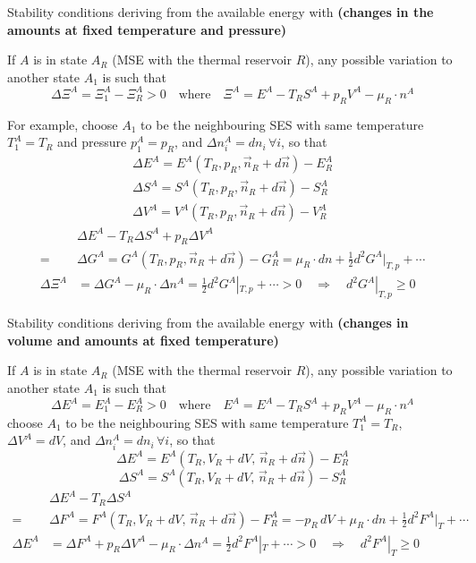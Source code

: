 \begin{thm}
    Stability conditions deriving from the available energy with \textbf{(changes in the \textcolor{b1}{amounts} at fixed temperature and pressure)}

    If \( A \) is in state \( A_R \) (MSE with the thermal reservoir \( R \)), any possible variation to another state \( A_1 \) is such that  
    \[
    \Delta \Xi^A = \Xi_1^A - \Xi_R^A > 0 \quad \text{where} \quad \Xi^A = E^A - T_R S^A + p_R V^A - \mu_R \cdot n^A
    \]

    For example, choose \( A_1 \) to be the neighbouring SES with same temperature \( T_1^A = T_R \) and pressure \( p_1^A = p_R \), and \(\Delta n_i^A = dn_i \, \forall i\), so that  
\begin{gather*}
        \Delta E^A = E^A (T_R, p_R, \vec{n}_R + d\vec{n}) - E_R^A
    \\
        \Delta S^A = S^A (T_R, p_R, \vec{n}_R + d\vec{n}) - S_R^A
    \\
        \Delta V^A = V^A (T_R, p_R, \vec{n}_R + d\vec{n}) - V_R^A
\end{gather*}
\begin{align*}
        &\Delta E^A - T_R \Delta S^A + p_R \Delta V^A\\
        =& \Delta G^A = G^A (T_R, p_R, \vec{n}_R + d\vec{n}) - G_R^A = \mu_R \cdot dn + \frac{1}{2} d^2 G^A |_{T,p} + \cdots
    \\
        \Delta \Xi^A &= \Delta G^A - \mu_R \cdot \Delta n^A = \frac{1}{2} d^2 G^A |_{T,p} + \cdots > 0 \quad \Rightarrow \quad d^2 G^A |_{T,p} \geq 0
\end{align*}
\end{thm}
\begin{thm}
    Stability conditions deriving from the available energy with \textbf{(changes in \textcolor{b1}{volume and amounts} at fixed temperature)}

    If \( A \) is in state \( A_R \) (MSE with the thermal reservoir \( R \)), any possible variation to another state \( A_1 \) is such that  
    \[
    \Delta E^A = E_1^A - E_R^A > 0 \quad \text{where} \quad E^A = E^A - T_R S^A + p_R V^A - \mu_R \cdot n^A
    \]
    choose \( A_1 \) to be the neighbouring SES with same temperature \( T_1^A = T_R \), \(\Delta V^A = dV\), and \(\Delta n_i^A = dn_i \, \forall i\), so that  
    \[
    \Delta E^A = E^A(T_R, V_R + dV, \, \vec{n}_R + d\vec{n}) - E_R^A
    \]
    \[
    \Delta S^A = S^A(T_R, V_R + dV, \, \vec{n}_R + d\vec{n}) - S_R^A
    \]
\begin{align*}
    &\Delta E^A - T_R \Delta S^A\\
    =& \Delta F^A = F^A(T_R, V_R + dV, \, \vec{n}_R + d\vec{n}) - F_R^A = -p_R \, dV + \mu_R \cdot dn + \frac{1}{2} d^2 F^A |_T + \cdots
    \\
    \Delta E^A &= \Delta F^A + p_R \Delta V^A - \mu_R \cdot \Delta n^A = \frac{1}{2} d^2 F^A |_T + \cdots > 0 \quad \Rightarrow \quad d^2 F^A |_T \geq 0
\end{align*}
\end{thm}

